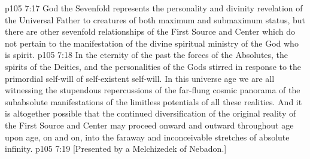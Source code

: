 \vs p105 7:17 God the Sevenfold represents the personality and divinity revelation of the Universal Father to creatures of both maximum and submaximum status, but there are other sevenfold relationships of the First Source and Center which do not pertain to the manifestation of the divine spiritual ministry of the God who is spirit.
\pc \vs p105 7:18 In the eternity of the past the forces of the Absolutes, the spirits of the Deities, and the personalities of the Gods stirred in response to the primordial self\hyp{}will of self\hyp{}existent self\hyp{}will. In this universe age we are all witnessing the stupendous repercussions of the far\hyp{}flung cosmic panorama of the subabsolute manifestations of the limitless potentials of all these realities. And it is altogether possible that the continued diversification of the original reality of the First Source and Center may proceed onward and outward throughout age upon age, on and on, into the faraway and inconceivable stretches of absolute infinity.
\vsetoff
\vs p105 7:19 [Presented by a Melchizedek of Nebadon.]
